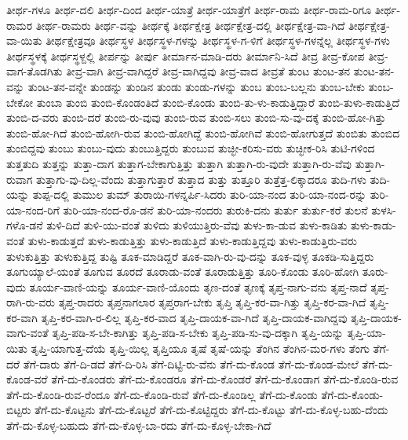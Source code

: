 {ತೀರ್ಥ-ಗಳೂ
ತೀರ್ಥ-ದಲಿ
ತೀರ್ಥ-ದಿಂದ
ತೀರ್ಥ-ಯಾತ್ರೆ
ತೀರ್ಥ-ಯಾತ್ರೆಗೆ
ತೀರ್ಥ-ರಾಮ
ತೀರ್ಥ-ರಾಮ-ರಿಗೂ
ತೀರ್ಥ-ರಾಮರ
ತೀರ್ಥ-ರಾಮರು
ತೀರ್ಥ-ವನ್ನು
ತೀರ್ಥಕ್ಕೆ
ತೀರ್ಥಕ್ಷೇತ್ರ
ತೀರ್ಥಕ್ಷೇತ್ರ-ದಲ್ಲಿ
ತೀರ್ಥಕ್ಷೇತ್ರ-ವಾ-ಗಿದೆ
ತೀರ್ಥಕ್ಷೇತ್ರ-ವಾ-ಯಿತು
ತೀರ್ಥಕ್ಷೇತ್ರವೂ
ತೀರ್ಥಸ್ಥಳ
ತೀರ್ಥಸ್ಥಳ-ಗಳನ್ನು
ತೀರ್ಥಸ್ಥಳ-ಗ-ಳಿಗೆ
ತೀರ್ಥಸ್ಥಳ-ಗಳನ್ನೆಲ್ಲ
ತೀರ್ಥಸ್ಥಳ-ಗಳು
ತೀರ್ಥಸ್ಥಳಕ್ಕೆ
ತೀರ್ಥಸ್ಥಳ್ದಲ್ಲಿ
ತೀರ್ಪನ್ನು
ತೀರ್ಪು
ತೀರ್ಮಾನ-ಮಾಡಿ-ದರು
ತೀರ್ಮಾನಿ-ಸಿದೆ
ತೀವ್ರ
ತೀವ್ರ-ಕೋಪ
ತೀವ್ರ-ವಾಗ-ತೊಡಗಿತು
ತೀವ್ರ-ವಾಗಿ
ತೀವ್ರ-ವಾಗಿದ್ದರೆ
ತೀವ್ರ-ವಾಗಿದ್ದವು
ತೀವ್ರ-ವಾದ
ತೀವ್ರತೆ
ತುಂಟ
ತುಂಟ-ತನ
ತುಂಟ-ತನ-ವನ್ನು
ತುಂಟ-ತನ-ವನ್ನೇ
ತುಂಡನ್ನು
ತುಂಡಿನ
ತುಂಡು
ತುಂಡು-ಗಳನ್ನು
ತುಂಬ
ತುಂಬ-ಬಲ್ಲನು
ತುಂಬ-ಬೇಕು
ತುಂಬ-ಬೇಕೋ
ತುಂಬಾ
ತುಂಬಿ
ತುಂಬಿ-ಕೊಂಡಂತಿದೆ
ತುಂಬಿ-ಕೊಂಡು
ತುಂಬಿ-ತು-ಳು-ಕಾಡುತ್ತಿದ್ದಾರೆ
ತುಂಬಿ-ತುಳು-ಕಾಡುತ್ತಿದೆ
ತುಂಬಿ-ದ-ವರು
ತುಂಬಿ-ದರೆ
ತುಂಬಿ-ರು-ವುವು
ತುಂಬಿ-ರುವ
ತುಂಬಿ-ಸಲು
ತುಂಬಿ-ಸು-ವು-ದಕ್ಕೆ
ತುಂಬಿ-ಹೋ-ಗಿತ್ತು
ತುಂಬಿ-ಹೋ-ಗಿದೆ
ತುಂಬಿ-ಹೋಗಿ-ರುವ
ತುಂಬಿ-ಹೋಗಿದ್ದೆ
ತುಂಬಿ-ಹೋಗಿವೆ
ತುಂಬಿ-ಹೋಗುತ್ತದೆ
ತುಂಬಿತು
ತುಂಬಿದ
ತುಂಬಿದ್ದವು
ತುಂಬು
ತುಂಬು-ವುದು
ತುಂಬುತ್ತಿದ್ದರು
ತುಂಬುವ
ತುಚ್ಛೀ-ಕರಿಸು-ವರು
ತುಚ್ಛೀಕ-ರಿಸಿ
ತುಟಿ-ಗಳಿಂದ
ತುತ್ತತುದಿ
ತುತ್ತನ್ನು
ತುತ್ತಾ-ದಾಗ
ತುತ್ತಾಗ-ಬೇಕಾಗುತ್ತಿತ್ತು
ತುತ್ತಾಗಿ
ತುತ್ತಾಗಿ-ರು-ವುದೇ
ತುತ್ತಾಗಿ-ರು-ವೆವು
ತುತ್ತಾಗಿ-ರುವಾಗ
ತುತ್ತಾಗು-ವು-ದಿಲ್ಲ-ವೆಂದು
ತುತ್ತಾಗುತ್ತಾರೆ
ತುತ್ತಾದ
ತುತ್ತು
ತುತ್ತೂರಿ
ತುತ್ತೆತ್ತ-ಲಿಕ್ಕಾದರೂ
ತುದಿ-ಗಳು
ತುದಿ-ಯನ್ನು
ತುಪ್ಪ-ದಲ್ಲಿ
ತುಮುಲ
ತುಮ್
ತುರಾಯಿ-ಗಳನ್ನರ್ಪಿ-ಸಿದರು
ತುರಿ-ಯಾ-ನಂದ
ತುರಿ-ಯಾ-ನಂದ-ರನ್ನು
ತುರಿ-ಯಾ-ನಂದ-ರಿಗೆ
ತುರಿ-ಯಾ-ನಂದ-ರೊ-ಡನೆ
ತುರಿ-ಯಾ-ನಂದರು
ತುರುಕಿ-ದನು
ತುರ್ತು
ತುರ್ತು-ಕರೆ
ತುಲನೆ
ತುಳಸಿ-ಗಳೊ-ಡನೆ
ತುಳಿ-ದಿದೆ
ತುಳಿ-ಯು-ವಂತೆ
ತುಳಿದು
ತುಳಿಯುತ್ತಿರು-ವೆವು
ತುಳು-ಕಾ-ಡುವ
ತುಳು-ಕಾಡಿತು
ತುಳು-ಕಾಡು-ವಂತೆ
ತುಳು-ಕಾಡುತ್ತದೆ
ತುಳು-ಕಾಡುತ್ತಿತ್ತು
ತುಳು-ಕಾಡುತ್ತಿದೆ
ತುಳು-ಕಾಡುತ್ತಿದ್ದವು
ತುಳು-ಕಾಡುತ್ತಿರು-ವರು
ತುಳುಕುತ್ತಿತ್ತು
ತುಳುಕುತ್ತಿದ್ದ
ತುಷ್ಟಿ
ತೂಕ-ಮಾಡಿದ್ದರೆ
ತೂಕ-ವಾಗಿ-ರು-ವು-ದನ್ನು
ತೂಕ-ವುಳ್ಳ
ತೂಕಡಿ-ಸುತ್ತಿದ್ದರು
ತೂಗುಯ್ಯಾಲೆ-ಯಂತೆ
ತೂಗುವ
ತೂರದೆ
ತೂರಾಡು-ವಂತೆ
ತೂರಾಡುತ್ತಿತ್ತು
ತೂರಿ-ಕೊಂಡು
ತೂರಿ-ಹೋಗಿ
ತೂರು-ವುದು
ತೂರ್ಯ-ವಾಣಿ-ಯನ್ನು
ತೂರ್ಯ-ವಾಣಿ-ಯೊಂದು
ತೃಣ-ದಂತೆ
ತೃಣಕ್ಕೆ
ತೃಪ್ತ-ನಾಗು-ವನು
ತೃಪ್ತ-ನಾದೆ
ತೃಪ್ತ-ರಾಗಿ-ರು-ವರು
ತೃಪ್ತ-ರಾದರು
ತೃಪ್ತನಾಗಲಾರ
ತೃಪ್ತರಾಗ-ಬೇಕು
ತೃಪ್ತಿ
ತೃಪ್ತಿ-ಕರ-ವಾ-ಗಿತ್ತು
ತೃಪ್ತಿ-ಕರ-ವಾ-ಗಿದೆ
ತೃಪ್ತಿ-ಕರ-ವಾಗಿ
ತೃಪ್ತಿ-ಕರ-ವಾಗಿ-ರ-ಲಿಲ್ಲ
ತೃಪ್ತಿ-ಕರ-ವಾದ
ತೃಪ್ತಿ-ದಾಯಕ-ವಾ-ಗಿದೆ
ತೃಪ್ತಿ-ದಾಯಕ-ವಾಗಿದ್ದವು
ತೃಪ್ತಿ-ದಾಯಕ-ವಾಗು-ವಂತೆ
ತೃಪ್ತಿ-ಪಡಿ-ಸ-ಬೇ-ಕಾಗಿತ್ತು
ತೃಪ್ತಿ-ಪಡಿ-ಸ-ಬೇಕು
ತೃಪ್ತಿ-ಪಡಿ-ಸು-ವು-ದಕ್ಕಾಗಿ
ತೃಪ್ತಿ-ಯನ್ನು
ತೃಪ್ತಿ-ಯಾ-ಯಿತು
ತೃಪ್ತಿ-ಯಾಗುತ್ತ-ದೆಯೆ
ತೃಪ್ತಿ-ಯಿಲ್ಲ
ತೃಪ್ತಿಯೂ
ತೃಷೆ
ತೃಷೆ-ಯನ್ನು
ತೆಂಗಿನ
ತೆಂಗಿನ-ಮರ-ಗಳು
ತೆಂಗು
ತೆಗೆ-ದರೆ
ತೆಗೆ-ದಾರು
ತೆಗೆ-ದಿ-ಡದೆ
ತೆಗೆ-ದಿ-ರಿಸಿ
ತೆಗೆ-ದಿಟ್ಟಿ-ರು-ವೆನು
ತೆಗೆ-ದು-ಕೊಂಡ
ತೆಗೆ-ದು-ಕೊಂಡ-ಮೇಲೆ
ತೆಗೆ-ದು-ಕೊಂಡ-ವರೆ
ತೆಗೆ-ದು-ಕೊಂಡರು
ತೆಗೆ-ದು-ಕೊಂಡರೂ
ತೆಗೆ-ದು-ಕೊಂಡರೆ
ತೆಗೆ-ದು-ಕೊಂಡಾಗ
ತೆಗೆ-ದು-ಕೊಂಡಿ-ರುವ
ತೆಗೆ-ದು-ಕೊಂಡಿ-ರುವ-ರೆಂದೂ
ತೆಗೆ-ದು-ಕೊಂಡಿ-ರುವೆ
ತೆಗೆ-ದು-ಕೊಂಡಿಲ್ಲ
ತೆಗೆ-ದು-ಕೊಂಡು
ತೆಗೆ-ದು-ಕೊಂಡು-ಬಿಟ್ಟರು
ತೆಗೆ-ದು-ಕೊಟ್ಟನು
ತೆಗೆ-ದು-ಕೊಟ್ಟರೆ
ತೆಗೆ-ದು-ಕೊಟ್ಟಿದ್ದರು
ತೆಗೆ-ದು-ಕೊಟ್ಟು
ತೆಗೆ-ದು-ಕೊಳ್ಳ-ಬಹು-ದೆಂದು
ತೆಗೆ-ದು-ಕೊಳ್ಳ-ಬಹುದು
ತೆಗೆ-ದು-ಕೊಳ್ಳ-ಬಾ-ರದು
ತೆಗೆ-ದು-ಕೊಳ್ಳ-ಬೇಕಾ-ಗಿದೆ
}
